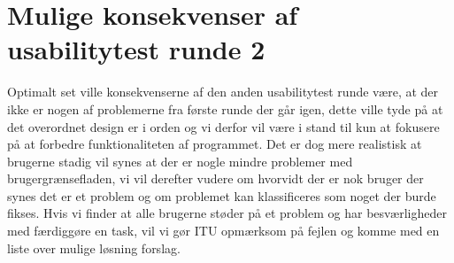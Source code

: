 \section{Mulige konsekvenser af usabilitytest runde 2}
\label{Usability_R2_Possibilities}
Optimalt set ville konsekvenserne af den anden usabilitytest runde være, at der ikke er nogen af problemerne fra første runde der går igen, dette ville tyde på at det overordnet design er i orden og vi derfor vil være i stand til kun at fokusere på at forbedre funktionaliteten af programmet.
Det er dog mere realistisk at brugerne stadig vil synes at der er nogle mindre problemer med brugergrænsefladen, vi vil derefter vudere om hvorvidt der er nok bruger der synes det er et problem og om problemet kan klassificeres som noget der burde fikses. Hvis vi finder at alle brugerne støder på et problem og har besværligheder med færdiggøre en task, vil vi gør ITU opmærksom på fejlen og komme med en liste over mulige løsning forslag.